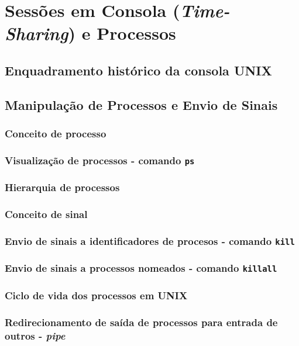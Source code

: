 \documentclass[a4paper, onecolumn, 10pt]{report}
\begin{document}
\chapter{Sessões em Consola (\textit{Time-Sharing}) e Processos}

\section{Enquadramento histórico da consola UNIX}

\section{Manipulação de Processos e Envio de Sinais}

\subsection{Conceito de processo}

\subsection{Visualização de processos - comando \texttt{ps}}

\subsection{Hierarquia de processos}

\subsection{Conceito de sinal}

\subsection{Envio de sinais a identificadores de procesos - comando \texttt{kill}}

\subsection{Envio de sinais a processos nomeados - comando \texttt{killall}}

\subsection{Ciclo de vida dos processos em UNIX}

\subsection{Redirecionamento de saída de processos para entrada de outros - \textit{pipe}}
\end{document}
